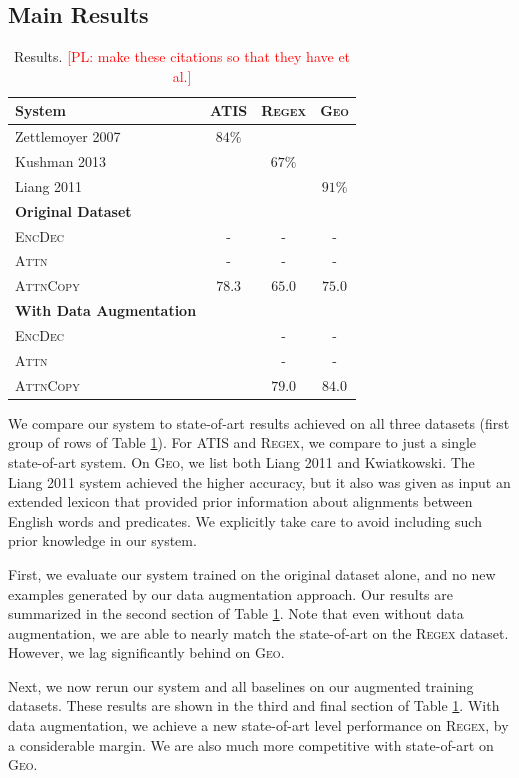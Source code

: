 \documentclass[11pt,letterpaper]{article}
\newcommand{\encdec}{\textsc{EncDec}\xspace}
\newcommand{\attn}{\textsc{Attn}\xspace}
\newcommand{\attncopy}{\textsc{AttnCopy}\xspace}
\newcommand{\atis}{\textsc{ATIS}\xspace}
\newcommand{\regex}{\textsc{Regex}\xspace}
\newcommand{\geo}{\textsc{Geo}\xspace}
\newcommand\pl[1]{\textcolor{red}{[PL: #1]}}
\begin{document}
\subsection{Main Results}
\begin{table}[t]
  \centering
  \small
  \begin{tabular}{|l|c|c|c|}
    \hline
    System & \atis & \regex & \geo \\
    \hline
    Zettlemoyer 2007 & $84\%$ & & \\
    Kushman 2013 & & $67\%$ & \\
    Liang 2011 & & & $91\%$ \\
    \hline
    \textbf{Original Dataset} & & & \\
    \encdec & - & - & - \\
    \attn & - & - & - \\
    \attncopy & $78.3$ & $65.0$ & $75.0$ \\
    \hline
    \textbf{With Data Augmentation} & & & \\
    \encdec & & - & - \\
    \attn & & - & - \\
    \attncopy & & $79.0$ & $84.0$ \\
    \hline
  \end{tabular}
  \caption{Results. \pl{make these citations so that they have et al.}}
  \label{tab:results}
\end{table}

We compare our system to state-of-art results
achieved on all three datasets (first group of rows of Table \ref{tab:results}).
For \atis and \regex, we compare to just a single state-of-art system.
On \geo, we list both Liang 2011 and Kwiatkowski.
The Liang 2011 system achieved the higher accuracy,
but it also was given as input an extended lexicon that
provided prior information about alignments between 
English words and predicates.  We explicitly take
care to avoid including such prior knowledge in our system.

First, we evaluate our system trained on the original dataset alone,
and no new examples generated by our data augmentation approach.
Our results are summarized in the second section of Table \ref{tab:results}.
Note that even without data augmentation, we are able to nearly
match the state-of-art on the \regex dataset.
However, we lag significantly behind on \geo.

Next, we now rerun our system and all baselines on our
augmented training datasets.  These results are shown in the
third and final section of Table \ref{tab:results}.
With data augmentation, we achieve a new state-of-art level performance
on \regex, by a considerable margin.  We are also much more competitive
with state-of-art on \geo.
\end{document}
